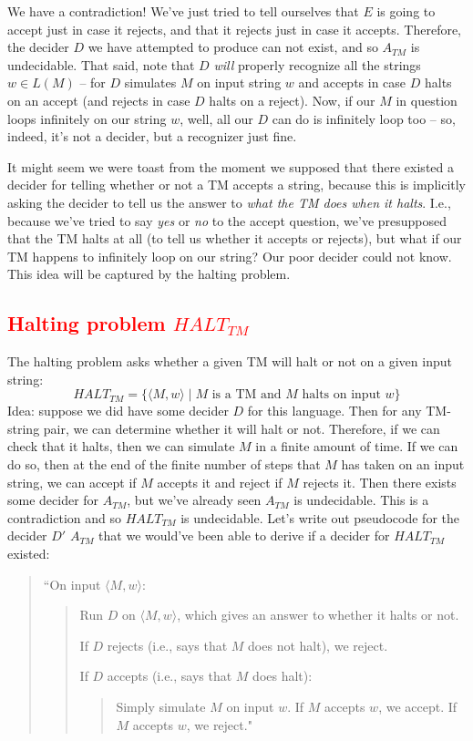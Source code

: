 \documentclass[11pt]{article}
\begin{document}
We have a contradiction! We've just tried to tell ourselves that $E$ is going to accept just in case it rejects, and that it rejects just in case it accepts. Therefore, the decider $D$ we have attempted to produce can not exist, and so $A_{TM}$ is undecidable. That said, note that $D$ \emph{will} properly recognize all the strings $w \in L(M)$ -- for $D$ simulates $M$ on input string $w$ and accepts in case $D$ halts on an accept (and rejects in case $D$ halts on a reject). Now, if our $M$ in question loops infinitely on our string $w$, well, all our $D$ can do is infinitely loop too -- so, indeed, it's not a decider, but a recognizer just fine.

It might seem we were toast from the moment we supposed that there existed a decider for telling whether or not a TM accepts a string, because this is implicitly asking the decider to tell us the answer to \emph{what the TM does when it halts}. I.e., because we've tried to say \emph{yes} or \emph{no} to the accept question, we've presupposed that the TM halts at all (to tell us whether it accepts or rejects), but what if our TM happens to infinitely loop on our string? Our poor decider could not know. This idea will be captured by the halting problem.

\subsection{\textcolor{red}{Halting problem $HALT_{TM}$}}
The halting problem asks whether a given TM will halt or not on a given input string:
\[HALT_{TM} = \{\langle M, w \rangle \mid M \text{ is a TM and } M \text{ halts on input } w\}\]
Idea: suppose we did have some decider $D$ for this language. Then for any TM-string pair, we can determine whether it will halt or not. Therefore, if we can check that it halts, then we can simulate $M$ in a finite amount of time. If we can do so, then at the end of the finite number of steps that $M$ has taken on an input string, we can accept if $M$ accepts it and reject if $M$ rejects it. Then there exists some decider for $A_{TM}$, but we've already seen $A_{TM}$ is undecidable. This is a contradiction and so $HALT_{TM}$ is undecidable. Let's write out pseudocode for the decider $D'$ $A_{TM}$ that we would've been able to derive if a decider for $HALT_{TM}$ existed:
\begin{quote}
``On input $\langle M, w \rangle$:
\begin{quote}
Run $D$ on $\langle M, w \rangle$, which gives an answer to whether it halts or not.

If $D$ rejects (i.e., says that $M$ does not halt), we reject.

If $D$ accepts (i.e., says that $M$ does halt):
\begin{quote}
Simply simulate $M$ on input $w$. If $M$ accepts $w$, we accept.
If $M$ accepts $w$, we reject."
\end{quote}
\end{quote}
\end{quote}
\end{document}
